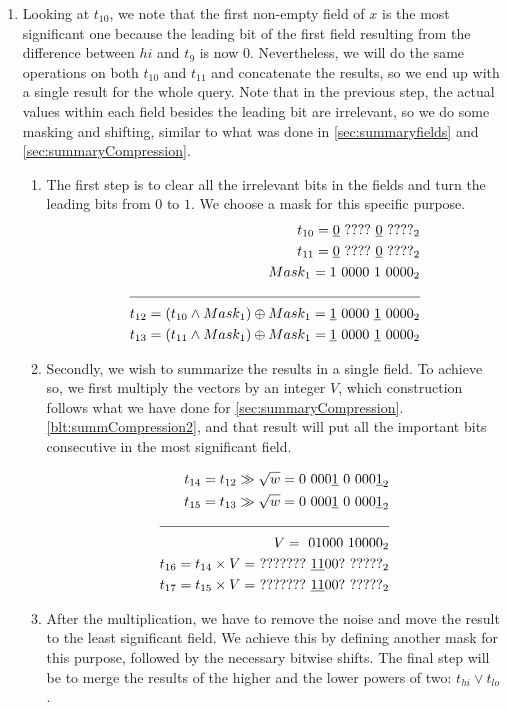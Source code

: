 \begin{enumerate}
    \item \label{blt:parallel4}
    Looking at $t_{10}$, we note that the first non-empty field of $x$ is the most significant one because the leading bit of the first field resulting from the difference between $hi$ and $t_9$ is now $0$. Nevertheless, we will do the same operations on both $t_{10}$ and $t_{11}$ and concatenate the results, so we end up with a single result for the whole query. Note that in the previous step, the actual values within each field besides the leading bit are irrelevant, so we do some masking and shifting, similar to what was done in \ref{sec:summaryfields} and \ref{sec:summaryCompression}.
    \begin{enumerate}
        \item
        The first step is to clear all the irrelevant bits in the fields and turn the leading bits from $0$ to $1$. We choose a mask for this specific purpose.
        \begin{align*}
            t_{10} = \underline{0}\ ????\ \underline{0}\ ????_2&\\
            t_{11} = \underline{0}\ ????\ \underline{0}\ ????_2&\\
            Mask_1 = 1\ 0000\ 1\ 0000_2&\\ \cline{1-2}
            t_{12} = (t_{10} \wedge Mask_1) \oplus Mask_1 = \underline{1}\ 0000\ \underline{1}\ 0000_2&\\
            t_{13} = (t_{11} \wedge Mask_1) \oplus Mask_1 = \underline{1}\ 0000\ \underline{1}\ 0000_2&
        \end{align*}
        \item
        Secondly, we wish to summarize the results in a single field. To achieve so, we first multiply the vectors by an integer $V$, which construction follows what we have done for \ref{sec:summaryCompression}.\ref{blt:summCompression2}, and that result will put all the important bits consecutive in the most significant field.
        
        \begin{align*}
            t_{14} = t_{12} \gg \sqrt{w} = 0\ 000\underline{1}\ 0\ 000\underline{1}_2& \\
            t_{15} = t_{13} \gg \sqrt{w} = 0\ 000\underline{1}\ 0\ 000\underline{1}_2& \\
            \cline{1-2}
            V =\ 01000\ 10000_2 & \\
            t_{16} = t_{14} \times V =\ ???????\ \underline{11}00?\ ?????_2& \\
            t_{17} = t_{15} \times V =\ ???????\ \underline{11}00?\ ?????_2& \\
        \end{align*}
        \item
        After the multiplication, we have to remove the noise and move the result to the least significant field. We achieve this by defining another mask for this purpose, followed by the necessary bitwise shifts. The final step will be to merge the results of the higher and the lower powers of two: $t_{hi} \vee t_{lo}$.
        

\end{enumerate}
\end{enumerate}
